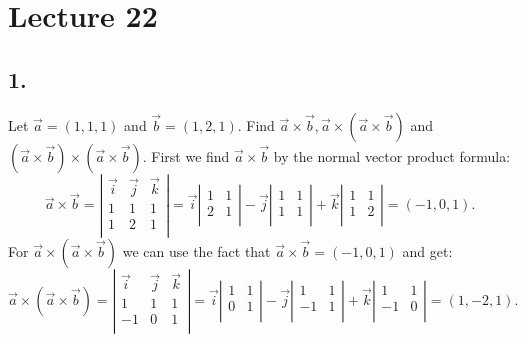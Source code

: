 \section*{Lecture 22}

\subsection*{1.} Let $\Vec{a} = \left( 1,1,1 \right) $ and $\Vec{b} = \left( 1,2,1 \right) $. Find $\Vec{a} \times \Vec{b}, \Vec{a} \times \left( \Vec{a} \times \Vec{b} \right) $ and $\left( \Vec{a} \times \Vec{b} \right) \times \left( \Vec{a} \times \Vec{b} \right)$.
\bigbreak
First we find $\Vec{a} \times \Vec{b}$ by the normal vector product formula:
\[ 
\Vec{a}\times \Vec{b} = \left| \begin{array}{ccc}
\Vec{i} & \Vec{j} & \Vec{k}\\
1 & 1 & 1\\
1 & 2 & 1\\
\end{array} \right| = \Vec{i} \left| \begin{array}{cc}
1 & 1\\
2 & 1\\
\end{array} \right| - \Vec{j} \left| \begin{array}{cc}
1 & 1\\
1 & 1\\
\end{array} \right| + \Vec{k} \left| \begin{array}{cc}
1 & 1\\
1 & 2\\
\end{array} \right| = \left( -1, 0, 1 \right) 
.\]
For $\Vec{a} \times \left( \Vec{a} \times \Vec{b} \right) $ we can use the fact that $\Vec{a} \times \Vec{b} = \left( -1, 0, 1 \right) $ and get:
\[ 
\Vec{a} \times \left( \Vec{a} \times \Vec{b} \right) = \left| \begin{array}{ccc}
\Vec{i} & \Vec{j} & \Vec{k}\\
1 & 1 & 1\\
-1 & 0 & 1\\
\end{array} \right| = \Vec{i} \left| \begin{array}{cc}
1 & 1\\
0 & 1\\
\end{array} \right| - \Vec{j} \left| \begin{array}{cc}
1 & 1\\
-1 & 1\\
\end{array} \right| + \Vec{k} \left| \begin{array}{cc}
1 & 1\\
-1 & 0\\
\end{array} \right| = \left( 1, -2, 1 \right) 
.\]

